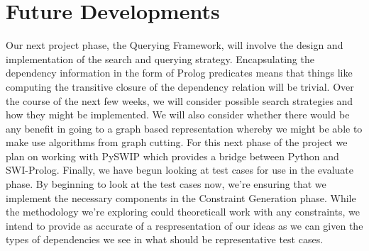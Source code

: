 \documentclass[11pt]{article}
\begin{document}
\section{Future Developments}

Our next project phase, the Querying Framework, will involve the design and
implementation of the search and querying strategy. Encapsulating the dependency
information in the form of Prolog predicates means that things like computing
the transitive closure of the dependency relation will be trivial. Over the
course of the next few weeks, we will consider possible search strategies and
how they might be implemented. We will also consider whether there would be any
benefit in going to a graph based representation whereby we might be able to
make use algorithms from graph cutting. For this next phase of the project we
plan on working with PySWIP \citep{pyswip} which provides a bridge between
Python and SWI-Prolog. Finally, we have begun looking at test cases for use in
the evaluate phase. By beginning to look at the test cases now, we're ensuring
that we implement the necessary components in the Constraint Generation phase.
While the methodology we're exploring could theoreticall work with any constraints,
we intend to provide as accurate of a respresentation of our ideas as we can given
the types of dependencies we see in what should be representative test cases.



\end{document}
